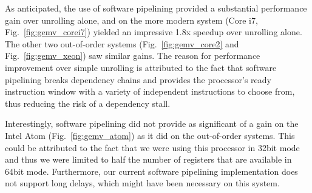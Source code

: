 \documentclass[10pt]{article}
\begin{document}

As anticipated, the use of software pipelining provided a substantial
performance gain over unrolling alone, and on the more modern system (Core i7,
Fig.~\ref{fig:gemv_corei7}) yielded an impressive 1.8x speedup over unrolling
alone. The other two out-of-order systems (Fig.~\ref{fig:gemv_core2} and
Fig.~\ref{fig:gemv_xeon}) saw similar gains. The reason for performance
improvement over simple unrolling is attributed to the fact that software
pipelining breaks dependency chains and provides the processor's ready
instruction window with a variety of independent instructions to choose from,
thus reducing the risk of a dependency stall.


Interestingly, software pipelining did not provide as significant of a gain on
the Intel Atom (Fig.~\ref{fig:gemv_atom}) as it did on the out-of-order
systems. This could be attributed to the fact that we were using this
processor in 32bit mode and thus we were limited to half the number of
registers that are available in 64bit mode. Furthermore, our current software
pipelining implementation does not support long delays, which might have been
necessary on this system.
\end{document}
